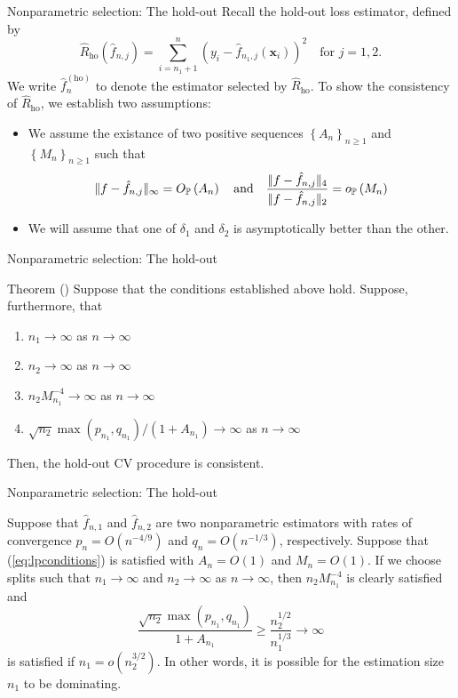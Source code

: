 \documentclass{beamer}
\newcommand{\0}{\emptyset}
\newcommand{\prob}{\mathbb{P}}
\newcommand{\paren}[1]{\left(#1 \right)}
\newcommand{\set}[1]{\left\{ #1 \right\}}
\newcommand{\norm}[1]{|\hspace{-1pt}|#1 |\hspace{-1pt}|}
\newcommand{\x}{\boldsymbol{x}}
\newcommand{\ho}{\hat{R}_{\mathrm{ho}}}
\newcommand{\op}[1]{o_{\prob}\paren{#1}}
\newcommand{\Op}[1]{O_{\prob}\paren{#1}}
\newcommand{\fhat}[2]{\hat{f}_{#1, #2}}
\newcommand{\fho}{\hat{f}^{(\mathrm{ho})}_{n}}
\newcommand{\1}{\mathmybb{1}}
\begin{document}
\begin{frame}{Nonparametric selection: The hold-out}
    Recall the \alert{hold-out} loss estimator, defined by
  \begin{equation}\label{def:holoss}
      \ho(\fhat{n}{j}) = \sum_{i=n_{1}+1}^{n}\paren{y_{i} - \fhat{n_{1}}{j}(\x_{i})}^{2}\quad\text{for }j=1,2.
  \end{equation}
  We write \(\fho\) to denote the estimator selected by \(\ho\).
  To show the consistency of \(\ho\), we establish two assumptions:  
  \begin{itemize}
    \item We assume the existance of two positive sequences \(\set{A_{n}}_{n\geq1}\) and \(\set{M_{n}}_{n\geq1}\) such that 
    \begin{equation}\label{eq:lpconditions}
      \norm{f-\fhat{n}{j}}_{\infty} = \Op{A_{n}}\quad\text{and}\quad\frac{\norm{f-\fhat{n}{j}}_{4}}{\norm{f-\fhat{n}{j}}_{2}} = \op{M_{n}}
    \end{equation}
    \item We will assume that one of \(\delta_{1}\) and \(\delta_{2}\) is asymptotically better than the other.
    
  \end{itemize}
\end{frame}

\begin{frame}{Nonparametric selection: The hold-out}
\begin{block}{Theorem (\cite{yang_2007})}
    Suppose that the conditions established above hold. Suppose, furthermore, that
    \begin{enumerate}
        \item \(n_{1}\to\infty\) as \(n\to\infty\)
        \item \(n_{2}\to\infty\) as \(n\to\infty\)
        \item \(n_{2}M_{n_{1}}^{-4} \to \infty\) as \(n\to\infty\)
        \item \(\sqrt{n_{2}}\max(p_{n_{1}}, q_{n_{1}})/\paren{1+A_{n_{1}}}\to\infty \) as \(n\to\infty\)
    \end{enumerate}
    Then, the hold-out CV procedure is consistent.
\end{block}
\end{frame}

\begin{frame}{Nonparametric selection: The hold-out}
  \begin{example}
    Suppose that \(\fhat{n}{1}\) and \(\fhat{n}{2}\) are two nonparametric estimators with rates of convergence \(p_{n}=O\paren{n^{-4/9}}\) and \(q_{n}=O\paren{n^{-1/3}}\), respectively. Suppose that (\ref{eq:lpconditions}) is satisfied with \(A_{n} = O(1)\) and \(M_{n}=O(1)\). If we choose splits such that \(n_{1}\to\infty\) and \(n_{2}\to\infty\) as \(n\to\infty\), then \(n_{2}M_{n_{1}}^{-4}\) is clearly satisfied and 
    \[\frac{\sqrt{n_{2}}\max(p_{n_{1}}, q_{n_{1}})}{1+A_{n_{1}}} \geq \frac{n_{2}^{1/2}}{n_{1}^{1/3}}\to\infty \]
    is satisfied if \(n_{1}=o\paren{n_{2}^{3/2}}\). In other words, it is possible for the estimation size \(n_{1}\) to be dominating.
  \end{example}
\end{frame}
\end{document}
